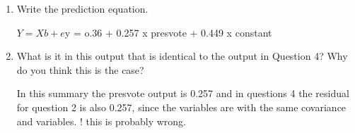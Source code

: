 \documentclass[12pt,letterpaper]{article}
\begin{document}
\begin{enumerate}
		
		\vspace{2cm}
		
		\item Write the prediction equation.	
		
		$Y = Xb + e
		$y = o.36 + 0.257 x  presvote + 0.449 x  constant 
		\vspace{2cm}
		
		\item What is it in this output that is identical to the output in Question 4? Why do you think this is the case?
		
In this summary the	presvote output is 0.257 and in questions 4 the residual for question 2 is also 0.257, since the variables are with the same covariance and variables. 
! this is probably wrong.

	\end{enumerate}
\end{document}
